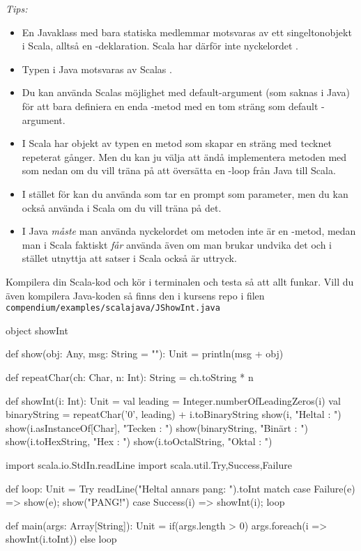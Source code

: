 \emph{Tips:}
\begin{itemize}[nolistsep, noitemsep]
\item En Javaklass med bara statiska medlemmar motsvaras av ett singeltonobjekt i Scala, alltså en -deklaration. Scala har därför inte nyckelordet .
\item Typen  i Java motsvaras av Scalas .
\item Du kan använda Scalas möjlighet med default-argument (som saknas i Java) för att bara definiera en enda -metod med en tom sträng som default -argument.
\item I Scala har objekt av typen  en metod  som skapar en sträng med tecknet repeterat  gånger. Men du kan ju välja att ändå implementera metoden  med  som nedan om du vill träna på att översätta en -loop från Java till Scala.
\item I stället för  kan du använda  som tar en prompt som parameter, men du kan också använda  i Scala om du vill träna på det.
\item I Java \emph{måste} man använda nyckelordet  om metoden inte är en -metod, medan man i Scala faktiskt \emph{får} använda  även om man brukar undvika det och i stället utnyttja att satser i Scala också är uttryck.
\end{itemize}
Kompilera din Scala-kod och kör i terminalen och testa så att allt funkar. Vill du även kompilera Java-koden så finns den i kursens repo i filen\\ \texttt{compendium/examples/scalajava/JShowInt.java}


\SOLUTION


\TaskSolved \what


\begin{Code}[numbers=left]
object showInt {
  def show(obj: Any, msg: String = ""): Unit = println(msg + obj)

  def repeatChar(ch: Char, n: Int): String = ch.toString * n

  def showInt(i: Int): Unit = {
    val leading = Integer.numberOfLeadingZeros(i)
    val binaryString = repeatChar('0', leading) + i.toBinaryString
    show(i,               "Heltal : ")
    show(i.asInstanceOf[Char],         "Tecken : ")
    show(binaryString,    "Binärt : ")
    show(i.toHexString,   "Hex    : ")
    show(i.toOctalString, "Oktal  : ")
  }


  import scala.io.StdIn.readLine
  import scala.util.{Try,Success,Failure}

  def loop: Unit =
    Try { readLine("Heltal annars pang: ").toInt } match {
      case Failure(e) => show(e); show("PANG!")
      case Success(i) => showInt(i); loop
    }

  def main(args: Array[String]): Unit =
    if(args.length > 0) args.foreach(i => showInt(i.toInt))
    else loop
}
\end{Code}



